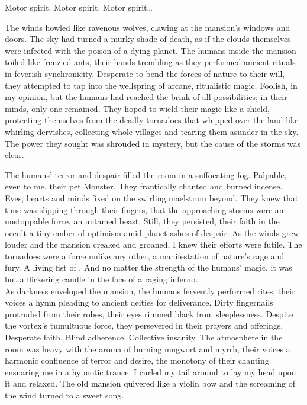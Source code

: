 Motor spirit. Motor spirit. Motor spirit… \\



The winds howled like ravenous wolves, clawing at the mansion's windows and doors. The sky had turned a murky shade of death, as if the clouds themselves were infected with the poison of a dying planet. The humans inside the mansion toiled like frenzied ants, their hands trembling as they performed ancient rituals in feverish synchronicity. Desperate to bend the forces of nature to their will, they attempted to tap into the wellspring of arcane, ritualistic magic. Foolish, in my opinion, but the humans had reached the brink of all possibilities; in their minds, only one remained. They hoped to wield their magic like a shield, protecting themselves from the deadly tornadoes that whipped over the land like whirling dervishes, collecting whole villages and tearing them asunder in the sky. The power they sought was shrouded in mystery, but the cause of the storms was clear. \\


The humans' terror and despair filled the room in a suffocating fog. Palpable, even to me, their pet  Monster. They frantically chanted and burned incense. Eyes, hearts and minds fixed on the swirling maelstrom beyond. They knew that time was slipping through their fingers, that the approaching storms were an unstoppable force, an untamed beast. Still, they persisted, their faith in the occult a tiny ember of optimism amid planet  ashes of despair. As the winds grew louder and the mansion creaked and groaned, I knew their efforts were futile. The tornadoes were a force unlike any other, a manifestation of nature's rage and fury. A living fist of . And no matter the strength of the humans' magic, it was but a flickering candle in the face of a raging inferno. \\

As darkness enveloped the mansion, the humans fervently performed rites, their voices a hymn pleading to ancient deities for deliverance. Dirty fingernails protruded from their robes, their eyes rimmed black from sleeplessness. Despite the vortex's tumultuous force, they persevered in their prayers and offerings. Desperate faith. Blind adherence. Collective insanity. The atmosphere in the room was heavy with the aroma of burning mugwort and myrrh, their voices a harmonic confluence of terror and desire, the monotony of their chanting ensnaring me in a hypnotic trance. I curled my tail around to lay my head upon it and relaxed. The old mansion quivered like a violin bow and the screaming of the wind turned to a sweet song. \\

